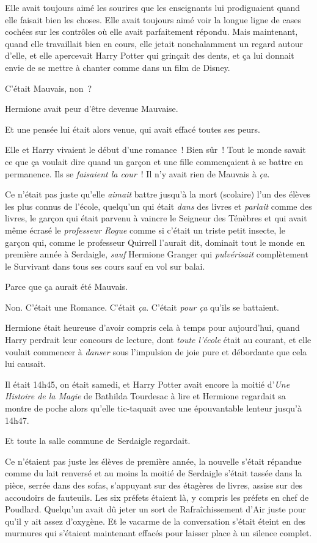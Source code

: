 Elle avait toujours aimé les sourires que les enseignants lui prodiguaient quand elle faisait bien les choses. Elle avait toujours aimé voir la longue ligne de cases cochées sur les contrôles où elle avait parfaitement répondu. Mais maintenant, quand elle travaillait bien en cours, elle jetait nonchalamment un regard autour d'elle, et elle apercevait Harry Potter qui grinçait des dents, et ça lui donnait envie de se mettre à chanter comme dans un film de Disney.

C'était Mauvais, non~?

Hermione avait peur d'être devenue Mauvaise.

Et une pensée lui était alors venue, qui avait effacé toutes ses peurs.

Elle et Harry vivaient le début d'une romance~! Bien sûr~! Tout le monde savait ce que ça voulait dire quand un garçon et une fille commençaient à se battre en permanence. Ils se \emph{faisaient la cour}~! Il n'y avait rien de Mauvais à \emph{ça}.

Ce n'était pas juste qu'elle \emph{aimait} battre jusqu'à la mort (scolaire) l'un des élèves les plus connus de l'école, quelqu'un qui était \emph{dans} des livres et \emph{parlait} comme des livres, le garçon qui était parvenu à vaincre le Seigneur des Ténèbres et qui avait même écrasé le \emph{professeur Rogue} comme si c'était un triste petit insecte, le garçon qui, comme le professeur Quirrell l'aurait dit, dominait tout le monde en première année à Serdaigle, \emph{sauf} Hermione Granger qui \emph{pulvérisait} complètement le Survivant dans tous ses cours sauf en vol sur balai.

Parce que ça aurait été Mauvais.

Non. C'était une Romance. C'était \emph{ça}. C'était \emph{pour ça} qu'ils se battaient.

Hermione était heureuse d'avoir compris cela à temps pour aujourd'hui, quand Harry perdrait leur concours de lecture, dont \emph{toute l'école} était au courant, et elle voulait commencer à \emph{danser} sous l'impulsion de joie pure et débordante que cela lui causait.

Il était 14h45, on était samedi, et Harry Potter avait encore la moitié d'\emph{Une Histoire de la Magie} de Bathilda Tourdesac à lire et Hermione regardait sa montre de poche alors qu'elle tic-taquait avec une épouvantable lenteur jusqu'à 14h47.

Et toute la salle commune de Serdaigle regardait.

Ce n'étaient pas juste les élèves de première année, la nouvelle s'était répandue comme du lait renversé et au moins la moitié de Serdaigle s'était tassée dans la pièce, serrée dans des sofas, s'appuyant sur des étagères de livres, assise sur des accoudoirs de fauteuils. Les six préfets étaient là, y compris les préfets en chef de Poudlard. Quelqu'un avait dû jeter un sort de Rafraîchissement d'Air juste pour qu'il y ait assez d'oxygène. Et le vacarme de la conversation s'était éteint en des murmures qui s'étaient maintenant effacés pour laisser place à un silence complet.

